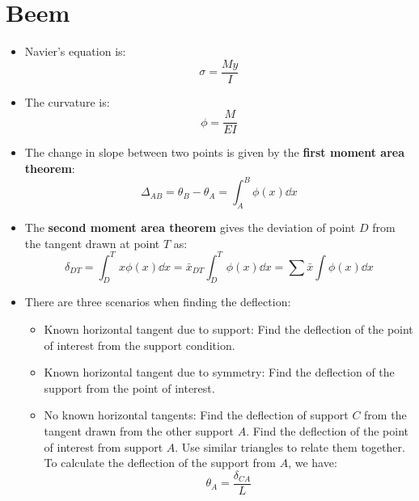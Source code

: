 \documentclass{article}
\begin{document}
\section{Beem}
\begin{itemize}
    \item Navier's equation is:
    \begin{equation}
        \sigma = \frac{My}{I}
        \label{eq:}
    \end{equation}
    \item The curvature is:
    \begin{equation}
        \phi = \frac{M}{EI}
        \label{eq:}
    \end{equation}
    \item The change in slope between two points is given by the \textbf{first moment area theorem}:
    \begin{equation}
        \Delta_{AB} = \theta_B - \theta_A = \int_A^B \phi(x) \dd{x}
        \label{eq:}
    \end{equation}
    \item The \textbf{second moment area theorem} gives the deviation of point $D$ from the tangent drawn at point $T$ as:
    \begin{equation}
        \delta_{DT} = \int_D^T x\phi(x) \dd{x} = \bar{x}_{DT}\int_D^T\phi(x) \dd{x} = \sum \bar{x}\int \phi(x) \dd{x}
        \label{eq:}
    \end{equation}
    \item There are three scenarios when finding the deflection:
    \begin{itemize}
        \item Known horizontal tangent due to support: Find the deflection of the point of interest from the support condition.
        \item Known horizontal tangent due to symmetry: Find the deflection of the support from the point of interest.
        \item No known horizontal tangents: Find the deflection of support $C$ from the tangent drawn from the other support $A$. Find the deflection of the point of interest from support $A$. Use similar triangles to relate them together. To calculate the deflection of the support from $A$, we have:
        \begin{equation}
            \theta_A = \frac{\delta_{CA}}{L}
            \label{eq:}
        \end{equation}
        

\end{itemize}
\end{itemize}
\end{document}
